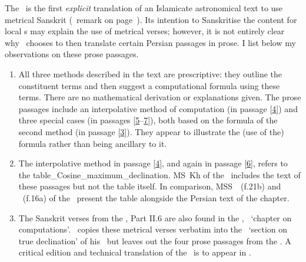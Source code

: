 The \Siddhantasindhu\ is the first \textit{explicit} translation of an Islamicate astronomical text to use metrical Sanskrit (\vid\ remark on page~\pageref{prose_poetry_mixed_form}). Its intention to Sanskritise the content for local \jyotisa s may explain the use of metrical verses; however, it is not entirely clear why \Nityananda\ chooses to then translate certain Persian passages in prose. I list below my observations on these prose passages. 
\begin{enumerate}[topsep=0pt]
    \item All three methods described in the text are prescriptive: they outline the constituent terms and then suggest a computational formula using these terms. There are no mathematical derivation or explanations given. The prose passages include an interpolative method of computation (in passage [\hyperlink{Spass4}{4}]) and three special cases (in passages  [\hyperlink{Spass5}{5}--\hyperlink{Spass7}{7}]), both based on the formula of the second method (in passage [\hyperlink{Spass3}{3}]). They appear to illustrate the (use of the) formula rather than being ancillary to it.
    \item The interpolative method in passage [\hyperlink{Spass4}{4}], and again in passage [\hyperlink{Spass6}{6}], refers to the \gls{table_Cosine_maximum_declination}. MS~Kh of the \Siddhantasindhu\ includes the text of these passages but not the table itself. In comparison, MSS~\SjA\ (f.\thinspace 21b) and \SjB\ (f.\thinspace 16a) of the \ZijiShahJahani\ present the table alongside the Persian text of the chapter.
    \item The Sanskrit verses from the \Siddhantasindhu, Part II.6 are also found in the \Sarvasiddhantaraja, \ganitadhyaya\ `chapter on computations'. \Nityananda\ copies these metrical verses verbatim into the \spastakrantyadhikara\ `section on true declination' of his \Sarvasiddhantaraja\ but leaves out the four prose passages from the \Siddhantasindhu. A critical edition and technical translation of the \spastakrantyadhikara\ is to appear in \textcite[forthcoming]{MisraTD}. 
\end{enumerate}
 
